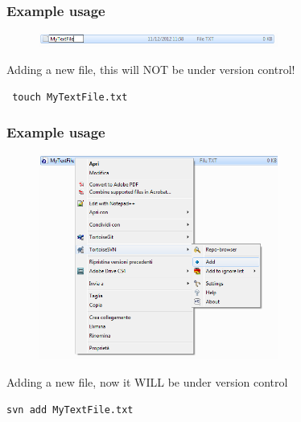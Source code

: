 \documentclass[10pt]{beamer}
\begin{document}
\begin{frame}[fragile]
\frametitle{Example usage}
\begin{figure}[h]
 \centering
 \includegraphics[width=0.7\textwidth]{images/image6.png}
\end{figure}
Adding a new file, this will NOT be under version control!
\begin{verbatim}
 touch MyTextFile.txt
\end{verbatim}
\end{frame}

\begin{frame}[fragile]
\frametitle{Example usage}
\begin{figure}[h]
 \centering
 \includegraphics[width=0.7\textwidth]{images/image7.png}
\end{figure}
Adding a new file, now it WILL be under version control
\begin{verbatim}
svn add MyTextFile.txt
\end{verbatim}
\end{frame}
\end{document}
